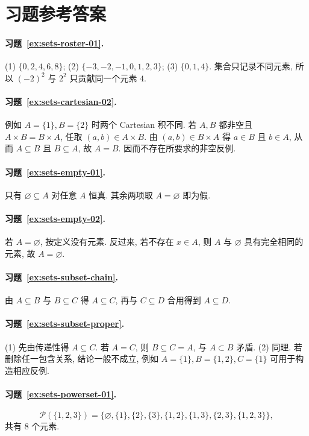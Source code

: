 \documentclass[usesamecnt, thmcnt=section, lang=cn, newtx, 10pt, scheme=chinese]{elegantbook}
\begin{document}
\newpage
\section{习题参考答案}

\paragraph*{习题~\ref{ex:sets-roster-01}.}
(1) $\{0,2,4,6,8\}$; (2) $\{-3,-2,-1,0,1,2,3\}$; (3) $\{0,1,4\}$. 集合只记录不同元素, 所以 $(-2)^2$ 与 $2^2$ 只贡献同一个元素 $4$.

\paragraph*{习题~\ref{ex:sets-cartesian-02}.}
例如 $A=\{1\},B=\{2\}$ 时两个 Cartesian 积不同. 若 $A,B$ 都非空且 $A\times B=B\times A$, 任取 $(a,b)\in A\times B$. 由 $(a,b)\in B\times A$ 得 $a\in B$ 且 $b\in A$, 从而 $A\subseteq B$ 且 $B\subseteq A$, 故 $A=B$. 因而不存在所要求的非空反例.

\paragraph*{习题~\ref{ex:sets-empty-01}.}
只有 $\varnothing\subseteq A$ 对任意 $A$ 恒真. 其余两项取 $A=\varnothing$ 即为假.

\paragraph*{习题~\ref{ex:sets-empty-02}.}
若 $A=\varnothing$, 按定义没有元素. 反过来, 若不存在 $x\in A$, 则 $A$ 与 $\varnothing$ 具有完全相同的元素, 故 $A=\varnothing$.

\paragraph*{习题~\ref{ex:sets-subset-chain}.}
由 $A\subseteq B$ 与 $B\subseteq C$ 得 $A\subseteq C$, 再与 $C\subseteq D$ 合用得到 $A\subseteq D$.

\paragraph*{习题~\ref{ex:sets-subset-proper}.}
(1) 先由传递性得 $A\subseteq C$. 若 $A=C$, 则 $B\subseteq C=A$, 与 $A\subset B$ 矛盾. (2) 同理. 若删除任一包含关系, 结论一般不成立, 例如 $A=\{1\},B=\{1,2\},C=\{1\}$ 可用于构造相应反例.

\paragraph*{习题~\ref{ex:sets-powerset-01}.}
\[
 \mathscr P(\{1,2,3\})=
 \{\varnothing,\{1\},\{2\},\{3\},\{1,2\},\{1,3\},\{2,3\},\{1,2,3\}\},
\]
共有 $8$ 个元素.
\end{document}
